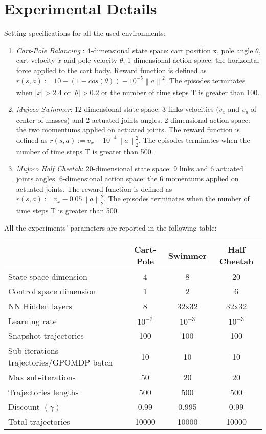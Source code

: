 \documentclass{article}
\theoremstyle{remark}
\theoremstyle{definition}
\newcommand{\norm}[2][\infty]{\left\|#2\right\|_{#1}}
\begin{document}
\section{Experimental Details}\label{app:exp}
Setting specifications for all the used environments:
\begin{enumerate}
	\item \emph{Cart-Pole Balancing} : 4-dimensional state space: cart position x, pole angle $\theta$, cart velocity $\dot{x}$ and pole velocity $\dot{\theta}$; 1-dimensional action space: the horizontal force applied to the cart body. Reward function  is defined as $r(s, a) := 10 - (1 - cos(\theta)) - 10^{-5}\norm[] a^2$. The episodes terminates when $|x|>2.4$ or $|\theta|>0.2$ or the number of time steps T is greater than 100.
	\item \emph{Mujoco Swimmer}: 12-dimensional state space: 3 links velocities ($v_x$ and $v_y$ of center of masses) and 2 actuated joints angles. 2-dimensional action space: the two momentums applied on actuated joints.  The reward function is defined as $r(s, a) := v_x - 10^{-4}\norm[2] a^2$. The episodes terminates when the number of time steps T is greater than 500.
	\item \emph{Mujoco Half Cheetah}: 20-dimensional state space: 9 links and 6 actuated joints angles. 6-dimensional action space: the 6 momentums applied on actuated joints.  The reward function is defined as $r(s, a) := v_x - 0.05\norm[2] a^2$. The episodes terminates when the number of time steps T is greater than 500.
\end{enumerate}

All the experiments' parameters are reported in the following table:

\centering
\begin{tabular}{| l | c  c  c |}
	\hline	
	& Cart-Pole & Swimmer & Half Cheetah \\
	\hline
	State space dimension  & 4 & 8 & 20 \\
	Control space dimension & 1 & 2 & 6 \\
	NN Hidden layers & 8 & 32x32 & 32x32 \\
	Learning rate & $10^{-2}$ & $10^{-3}$ & $10^{-3}$ \\
	Snapshot trajectories & 100 & 100 & 100 \\
	Sub-iterations trajectories/GPOMDP batch & 10 & 10 & 10 \\
	Max sub-iterations & 50 & 20 & 20 \\
	Trajectories lengths& 500 & 500 & 500 \\
	Discount $(\gamma)$& 0.99 & 0.995 & 0.99 \\
	Total trajectories& 10000 & 10000 & 10000 \\
	\hline  
\end{tabular}
\end{document}

